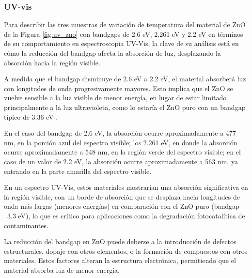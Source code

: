 \documentclass[12pt]{article}
\begin{document}
 \subsubsection{UV-vis}
 Para describir las tres muestras de variación de temperatura del material de ZnO de la Figura \ref{fig:uv_zno} con bandgaps de 2.6 eV, 2.261 eV y 2.2 eV en términos de su comportamiento en espectroscopia UV-Vis, la clave de su análisis está en cómo la reducción del bandgap afecta la absorción de luz, desplazando la absorción hacia la región visible.\vspace{1em} %
 
A medida que el bandgap disminuye de 2.6 eV a 2.2 eV, el material absorberá luz con longitudes de onda progresivamente mayores. Esto implica que el ZnO se vuelve sensible a la luz visible de menor energía, en lugar de estar limitado principalmente a la luz ultravioleta, como lo estaría el ZnO puro con un bandgap típico de 3.36 eV \cite{IEEEreferencias:ZnOGO_Fotocatalisis_2}.\vspace{1em} %

En el caso del bandgap de 2.6 eV, la absorción ocurre aproximadamente a 477 nm, en la porción azul del espectro visible; los 2.261 eV, en donde la absorción ocurre aproximadamente a 548 nm, en la región verde del espectro visible; en el caso de un valor de 2.2 eV, la absorción ocurre aproximadamente a 563 nm, ya entrando en la parte amarilla del espectro visible.\vspace{1em} %

En un espectro UV-Vis, estos materiales mostrarían una absorción significativa en la región visible, con un borde de absorción que se desplaza hacia longitudes de onda más largas (menores energías) en comparación con el ZnO puro (bandgap ~3.3 eV), lo que es crítico para aplicaciones como la degradación fotocatalítica de contaminantes.\vspace{1em} %

La reducción del bandgap en ZnO puede deberse a la introducción de defectos estructurales, dopaje con otros elementos, o la formación de compuestos con otros materiales. Estos factores alteran la estructura electrónica, permitiendo que el material absorba luz de menor energía.
\end{document}
